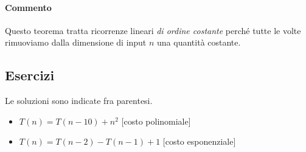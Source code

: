 \paragraph{Commento}
Questo teorema tratta ricorrenze lineari \emph{di ordine costante} perché tutte le volte rimuoviamo dalla dimensione di input \(n\) una quantità costante.

\subsection*{Esercizi}

Le soluzioni sono indicate fra parentesi.
\begin{itemize}[label=\textbullet]
	\item \(T(n) = T(n-10) + n^2\) \hfill[costo polinomiale]
	\item \(T(n) = T(n-2) - T(n-1) + 1\) \hfill[costo esponenziale]
\end{itemize}

\ifsubfile

\fi
